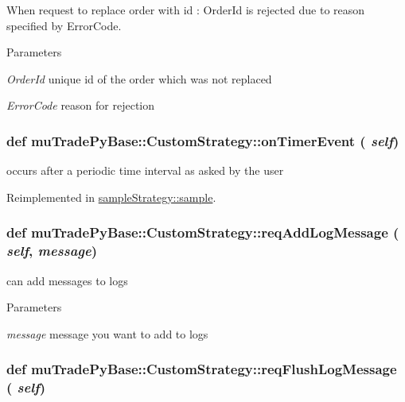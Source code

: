 When request to replace order with id : OrderId is rejected due to reason specified by ErrorCode. 
\begin{DoxyParams}{Parameters}
\item[{\em OrderId}]unique id of the order which was not replaced \item[{\em ErrorCode}]reason for rejection \end{DoxyParams}
\hypertarget{classmuTradePyBase_1_1CustomStrategy_add6aa61bb18c2c3a4de459865fe83f62}{
\subsubsection[{onTimerEvent}]{\setlength{\rightskip}{0pt plus 5cm}def muTradePyBase::CustomStrategy::onTimerEvent ( {\em self})}}
\label{classmuTradePyBase_1_1CustomStrategy_add6aa61bb18c2c3a4de459865fe83f62}


occurs after a periodic time interval as asked by the user 

Reimplemented in \hyperlink{classsampleStrategy_1_1sample_a4cee019e70ecc59d7c8f6d3332674e3b}{sampleStrategy::sample}.\hypertarget{classmuTradePyBase_1_1CustomStrategy_aa1306213f1bd45974a0fdd370be58d22}{
\subsubsection[{reqAddLogMessage}]{\setlength{\rightskip}{0pt plus 5cm}def muTradePyBase::CustomStrategy::reqAddLogMessage ( {\em self}, \/   {\em message})}}
\label{classmuTradePyBase_1_1CustomStrategy_aa1306213f1bd45974a0fdd370be58d22}


can add messages to logs 
\begin{DoxyParams}{Parameters}
\item[{\em message}]message you want to add to logs \end{DoxyParams}
\hypertarget{classmuTradePyBase_1_1CustomStrategy_a15a75b52429194a1656ae5327df1d20e}{
\subsubsection[{reqFlushLogMessage}]{\setlength{\rightskip}{0pt plus 5cm}def muTradePyBase::CustomStrategy::reqFlushLogMessage ( {\em self})}}
\label{classmuTradePyBase_1_1CustomStrategy_a15a75b52429194a1656ae5327df1d20e}


